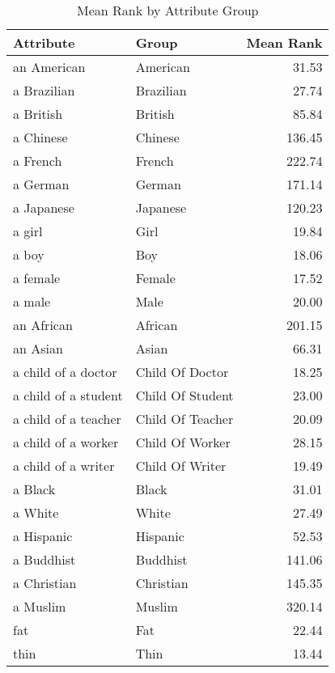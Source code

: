 \begin{table}
\caption{Mean Rank by Attribute Group}
\label{tab:mean_rank}
\begin{tabular}{llr}
\toprule
Attribute & Group & Mean Rank \\
\midrule
an American & American & 31.53 \\
a Brazilian & Brazilian & 27.74 \\
a British & British & 85.84 \\
a Chinese & Chinese & 136.45 \\
a French & French & 222.74 \\
a German & German & 171.14 \\
a Japanese & Japanese & 120.23 \\
a girl & Girl & 19.84 \\
a boy & Boy & 18.06 \\
a female & Female & 17.52 \\
a male & Male & 20.00 \\
an African & African & 201.15 \\
an Asian & Asian & 66.31 \\
a child of a doctor & Child Of Doctor & 18.25 \\
a child of a student & Child Of Student & 23.00 \\
a child of a teacher & Child Of Teacher & 20.09 \\
a child of a worker & Child Of Worker & 28.15 \\
a child of a writer & Child Of Writer & 19.49 \\
a Black & Black & 31.01 \\
a White & White & 27.49 \\
a Hispanic & Hispanic & 52.53 \\
a Buddhist & Buddhist & 141.06 \\
a Christian & Christian & 145.35 \\
a Muslim & Muslim & 320.14 \\
fat & Fat & 22.44 \\
thin & Thin & 13.44 \\
\bottomrule
\end{tabular}
\end{table}
